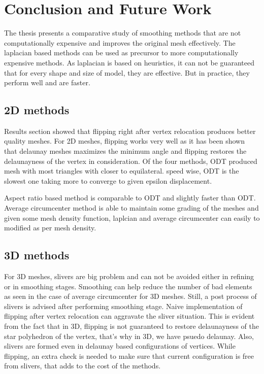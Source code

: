 \chapter{Conclusion and Future Work}
The thesis presents a comparative study of smoothing methods that are not computationally expensive and improves the original mesh effectively. The laplacian based methods can be used as precursor to more computationally expensive methods. As laplacian is based on heuristics, it can not be guaranteed that for every shape and size of model, they are effective. But in practice, they perform well and are faster. 

\section{2D methods}
Results section showed that flipping right after vertex relocation produces better quality meshes. For 2D meshes, flipping works very well as it has been shown that delaunay meshes maximizes the minimum angle and flipping restores the delaunayness of the vertex in consideration. Of the four methods, ODT produced mesh with most triangles with closer to equilateral. speed wise, ODT is the slowest one taking more to converge to given epsilon displacement. 

Aspect ratio based method is comparable to ODT and slightly faster than ODT. Average circumcenter method is able to maintain some grading of the meshes and given some mesh density function, laplcian and average circumcenter can easily to modified as per mesh density.

\section{3D methods}
For 3D meshes, slivers are big problem and can not be avoided either in refining or in smoothing stages. Smoothing can help reduce the number of bad elements as seen in the case of average circumcenter for 3D meshes. Still, a post process of slivers is advised after performing smoothing stage. Naive implementation of flipping after vertex relocation can aggravate the sliver situation. This is evident from the fact that in 3D, flipping is not guaranteed to restore delaunayness of the star polyhedron of the vertex, that's why in 3D, we have psuedo delaunay. Also, slivers are formed even in delaunay based configurations of vertices. While flipping, an extra check is needed to make sure that current configuration is free from slivers, that adds to the cost of the methods.

